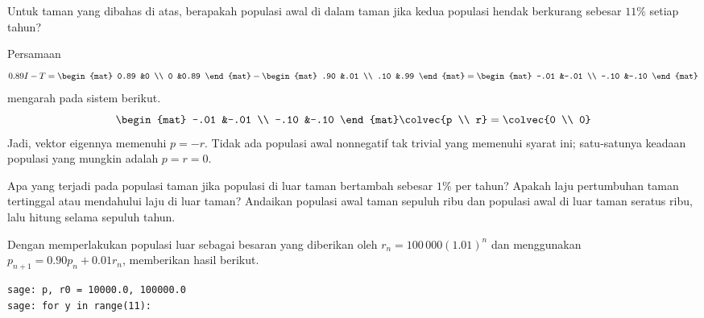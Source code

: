 \begin{exercises}
  \item 
    Untuk taman yang dibahas di atas, berapakah populasi awal di dalam taman
    jika kedua populasi hendak berkurang sebesar $11\%$ setiap tahun?
    \begin{answer}
      Persamaan 
      \begin{equation*}
         0.89I-T
         =
         \begin{mat}
           0.89 &0 \\
           0 &0.89
         \end{mat}
         -
         \begin{mat}
           .90  &.01  \\
           .10  &.99
         \end{mat}
         =
         \begin{mat}
           -.01  &-.01  \\
           -.10  &-.10
         \end{mat}
      \end{equation*} 
      mengarah pada sistem berikut.
      \begin{equation*}
        \begin{mat}
          -.01  &-.01  \\
          -.10  &-.10
        \end{mat}
        \colvec{p \\ r}
        =
        \colvec{0  \\ 0}
      \end{equation*}
      Jadi, vektor eigennya memenuhi $p=-r$. Tidak ada populasi awal nonnegatif
      tak trivial yang memenuhi syarat ini; satu-satunya keadaan populasi yang
      mungkin adalah $p=r=0$.
    \end{answer}
  \item 
    Apa yang terjadi pada populasi taman jika populasi di luar taman bertambah
    sebesar $1\%$ per tahun?
    Apakah laju pertumbuhan taman tertinggal atau mendahului laju di luar taman?
    Andaikan populasi awal taman sepuluh ribu dan populasi awal di luar taman
    seratus ribu, lalu hitung selama sepuluh tahun.
    \begin{answer}
      Dengan memperlakukan populasi luar sebagai besaran yang diberikan oleh
      $r_n=100\,000(1.01)^n$ dan menggunakan
      $p_{n+1}=0.90p_n+0.01r_n$, \Sage{} memberikan hasil berikut.
\begin{lstlisting}
sage: p, r0 = 10000.0, 100000.0
sage: for y in range(11):

\end{lstlisting}
\end{answer}
\end{exercises}
